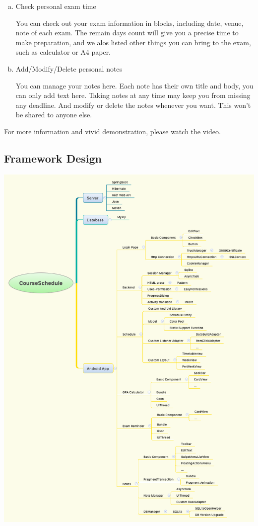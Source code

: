 \documentclass{article}
\begin{document}
\begin{enumerate}[a)]
    \item Check personal exam time
    
    You can check out your exam information in blocks, 
    including date, venue, note of each exam.
    The remain days count will give you a precise time 
    to make preparation, 
    and we alos listed other things you can bring to the exam,
    such as calculator or A4 paper.

    \item Add/Modify/Delete personal notes
    
    You can manage your notes here. 
    Each note has their own title and body,
    you can only add text here.
    Taking notes at any time may keep you from missing any deadline.
    And modify or delete the notes whenever you want.
    This won't be shared to anyone else.
    \end{enumerate}

    For more information and vivid demonstration, 
    please watch the video.

    \subsection{Framework Design}
    \begin{center}
        \includegraphics[width=6.3in]{CourseScheduleFramework}
    \end{center}
    
\end{document}
